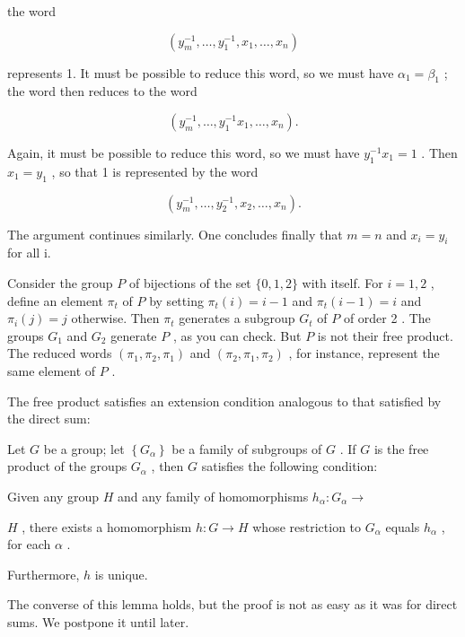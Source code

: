 the word

\[
\left( {{y}_{m}^{-1},\ldots ,{y}_{1}^{-1},{x}_{1},\ldots ,{x}_{n}}\right)
\]

represents 1. It must be possible to reduce this word, so we must have \({\alpha }_{1} = {\beta }_{1}\) ; the word then reduces to the word

\[
\left( {{y}_{m}^{-1},\ldots ,{y}_{1}^{-1}{x}_{1},\ldots ,{x}_{n}}\right) .
\]

Again, it must be possible to reduce this word, so we must have \({y}_{1}^{-1}{x}_{1} = 1\) . Then \({x}_{1} = {y}_{1}\) , so that 1 is represented by the word

\[
\left( {{y}_{m}^{-1},\ldots ,{y}_{2}^{-1},{x}_{2},\ldots ,{x}_{n}}\right) .
\]

The argument continues similarly. One concludes finally that \(m = n\) and \({x}_{i} = {y}_{i}\) for all i.

\begin{example} Consider the group \(P\) of bijections of the set \(\{ 0,1,2\}\) with itself. For \(i = 1,2\) , define an element \({\pi }_{t}\) of \(P\) by setting \({\pi }_{t}\left( i\right)  = i - 1\) and \({\pi }_{t}\left( {i - 1}\right)  = i\) and \({\pi }_{i}\left( j\right)  = j\) otherwise. Then \({\pi }_{t}\) generates a subgroup \({G}_{t}\) of \(P\) of order 2 . The groups \({G}_{1}\) and \({G}_{2}\) generate \(P\) , as you can check. But \(P\) is not their free product. The reduced words \(\left( {{\pi }_{1},{\pi }_{2},{\pi }_{1}}\right)\) and \(\left( {{\pi }_{2},{\pi }_{1},{\pi }_{2}}\right)\) , for instance, represent the same element of \(P\) .
\end{example}

The free product satisfies an extension condition analogous to that satisfied by the direct sum:

\begin{lemma} Let \(G\) be a group; let \(\left\{  {G}_{\alpha }\right\}\) be a family of subgroups of \(G\) . If \(G\) is the free product of the groups \({G}_{\alpha }\) , then \(G\) satisfies the following condition:

Given any group \(H\) and any family of homomorphisms \({h}_{\alpha } : {G}_{\alpha } \rightarrow\)

\(H\) , there exists a homomorphism \(h : G \rightarrow  H\) whose restriction to \({G}_{\alpha }\) equals \({h}_{\alpha }\) , for each \(\alpha\) .

Furthermore, \(h\) is unique.

The converse of this lemma holds, but the proof is not as easy as it was for direct sums. We postpone it until later.
\end{lemma}

